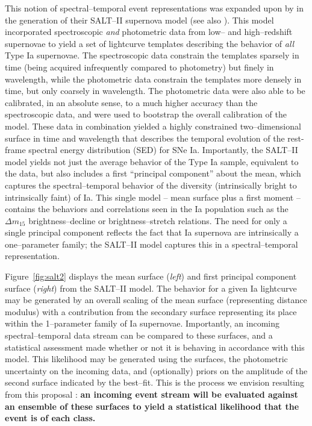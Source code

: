 This notion of spectral--temporal event representations was expanded upon  by
\cite{2007A&A...466...11G} in the generation of their SALT--II supernova model
(see also \cite{2007ApJ...663.1187H}).  This model incorporated spectroscopic
{\it and} photometric data from low-- and high--redshift supernovae to yield a
set of lightcurve templates describing the behavior of {\it all} Type Ia
supernovae. The spectroscopic data constrain the templates sparsely in time
(being acquired infrequently compared to photometry) but finely in wavelength,
while the photometric data constrain the templates more densely in time, but
only coarsely in wavelength.  The photometric data were also able to be
calibrated, in an absolute sense, to a much higher accuracy than the
spectroscopic data, and were used to bootstrap the overall calibration of the
model.  These data in combination yielded a highly constrained two--dimensional
surface in time and wavelength that describes the temporal evolution of the
rest-frame spectral energy distribution (SED) for SNe Ia. Importantly, the
SALT--II model yields not just the average behavior of the Type Ia sample,
equivalent to the \cite{2002PASP..114..803N} data, but also includes a first
``principal component'' about the mean, which captures the spectral--temporal
behavior of the diversity (intrinsically bright to intrinsically faint) of Ia.
This single model -- mean surface plus a first moment -- contains the behaviors
and correlations seen in the Ia population such as the $\Delta m_{15}$
brightness--decline \citep{1993ApJ...413L.105P} or brightness--stretch
\citep{1998AJ....116.1009R} relations.  The need for only a single principal
component reflects the fact that Ia supernova are intrinsically a one--parameter
family; the SALT--II model captures this in a spectral--temporal representation.

Figure~\ref{fig:salt2} displays the mean surface ({\it left}) and first
principal component surface ({\it right}) from the SALT--II model.  The behavior
for a given Ia lightcurve may be generated by an overall scaling of the mean
surface (representing distance modulus) with a contribution from the secondary
surface representing its place within the 1--parameter family of Ia supernovae.
Importantly, an incoming spectral--temporal data stream can be compared to these
surfaces, and a statistical assessment made whether or not it is behaving in
accordance with this model.  This likelihood may be generated using the
surfaces, the photometric uncertainty on the incoming data, and (optionally)
priors on the amplitude of the second surface indicated by the best--fit.  This
is the process we envision resulting from this proposal : {\bf an incoming event
stream will be evaluated against an ensemble of these surfaces to yield a
statistical likelihood that the event is of each class.}


